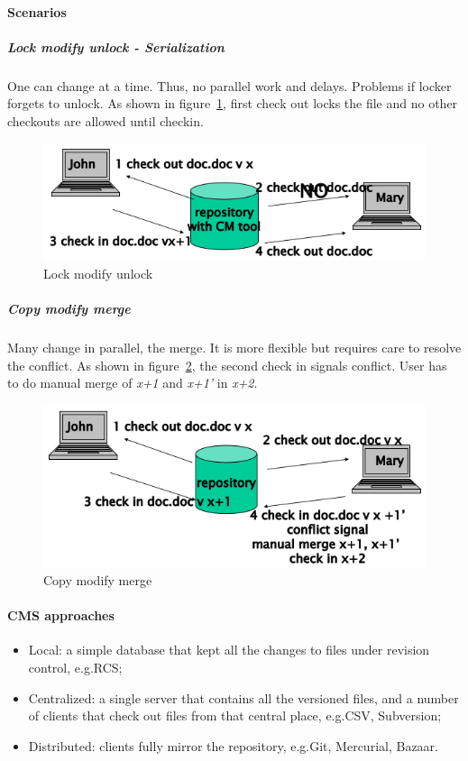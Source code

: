 \paragraph{Scenarios}
\subparagraph{Lock modify unlock - Serialization}
One can change at a time. Thus, no parallel work and delays. Problems if locker forgets to unlock. As shown in figure~\ref{img:lock_modify_unlock}, first check out locks the file and no other checkouts are allowed until checkin.

\begin{figure}[hbtp]
\centering
\includegraphics[scale=0.4]{images/lock_modify_unlock.png}
\caption{Lock modify unlock}
\label{img:lock_modify_unlock}
\end{figure}

\subparagraph{Copy modify merge}
Many change in parallel, the merge. It is more flexible but requires care to resolve the conflict. As shown in figure~\ref{img:copy_modify_merge}, the second check in signals conflict. User has to do manual merge of \emph{x+1} and \emph{x+1'} in \emph{x+2}.

\begin{figure}[hbtp]
\centering
\includegraphics[scale=0.4]{images/copy_modify_merge.png}
\caption{Copy modify merge}
\label{img:copy_modify_merge}
\end{figure}

\paragraph{CMS approaches}
\begin{itemize}
\item Local: a simple database that kept all the changes to files under revision control, e.g.\@ RCS;
\item Centralized: a single server that contains all the versioned files, and a number of clients that check out files from that central place, e.g.\@ CSV, Subversion;
\item Distributed: clients fully mirror the repository, e.g.\@ Git, Mercurial, Bazaar.
\end{itemize}

